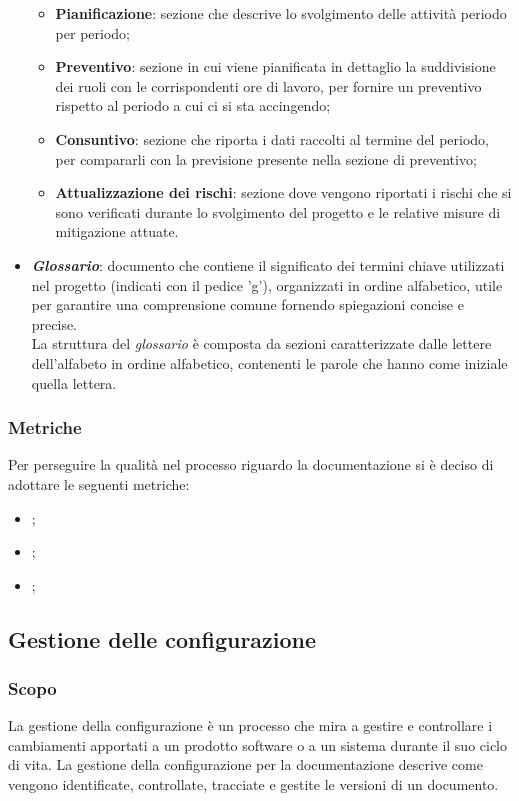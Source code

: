\begin{itemize}
\begin{itemize}
                \item \textbf{Pianificazione}: sezione che descrive lo svolgimento delle attività periodo per periodo;
                \item \textbf{Preventivo}: sezione in cui viene pianificata in dettaglio la suddivisione dei ruoli con le corrispondenti ore di lavoro, per fornire un preventivo rispetto al periodo a cui ci si sta accingendo;
                \item \textbf{Consuntivo}: sezione che riporta i dati raccolti al termine del periodo, per compararli con la previsione presente nella sezione di preventivo;
                \item \textbf{Attualizzazione dei rischi}: sezione dove vengono riportati i rischi che si sono verificati durante lo svolgimento del progetto e le relative misure di mitigazione attuate.
            \end{itemize}
            \item \textit{\textbf{Glossario}}: documento che contiene il significato dei termini chiave utilizzati nel progetto (indicati con il pedice 'g'), organizzati in ordine alfabetico, utile per garantire una comprensione comune fornendo spiegazioni concise e precise.
            \\La struttura del \textit{glossario} è composta da sezioni caratterizzate dalle lettere dell'alfabeto in ordine alfabetico, contenenti le parole che hanno come iniziale quella lettera.
        \end{itemize}

        \subsubsection{Metriche}
        Per perseguire la qualità nel processo riguardo la documentazione si è deciso di adottare le seguenti metriche:
        \begin{itemize}
                \item {};
                \item {};
                \item {};
        \end{itemize}

    \subsection{Gestione delle configurazione}
        \subsubsection{Scopo}
        La gestione della configurazione è un processo che mira a gestire e controllare i cambiamenti apportati
        a un prodotto software o a un sistema durante il suo ciclo di vita. La gestione della configurazione per
        la documentazione descrive come vengono identificate, controllate, tracciate e gestite le versioni di un
        documento.
